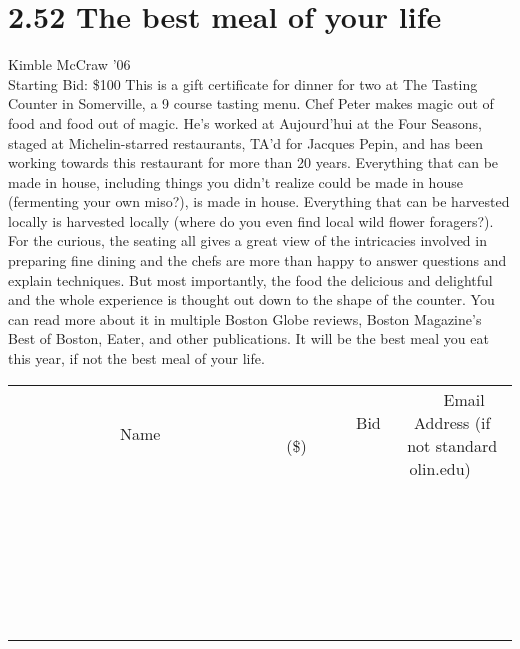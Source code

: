 \documentclass[11pt]{article}
\begin{document}
\section*{2.52 The best meal of your life}
Kimble McCraw '06
\\
Starting Bid: \$100
\newline
This is a gift certificate for dinner for two at The Tasting Counter in Somerville, a 9 course tasting menu. Chef Peter makes magic out of food and food out of magic. He's worked at Aujourd’hui at the Four Seasons, staged at Michelin-starred restaurants, TA'd for Jacques Pepin, and has been working towards this restaurant for more than 20 years. Everything that can be made in house, including things you didn't realize could be made in house (fermenting your own miso?), is made in house. Everything that can be harvested locally is harvested locally (where do you even find local wild flower foragers?). For the curious, the seating all gives a great view of the intricacies involved in preparing fine dining and the  chefs are more than happy to answer questions and explain techniques. But most importantly, the food the delicious and delightful and the whole experience is thought out down to the shape of the counter. You can read more about it in multiple Boston Globe reviews, Boston Magazine's Best of Boston, Eater, and other publications. It will be the best meal you eat this year, if not the best meal of your life.
\\[6ex]
\begin{tabular}{c c c}
~~~~~~~~~~~~~Name~~~~~~~~~~~~~ & ~~~~~~~~~Bid (\$)~~~~~~~~~  & ~~~Email Address (if not standard olin.edu)~~~\\
 & & \\
\hline
 & & \\
\hline
 & & \\
\hline
 & & \\
\hline
 & & \\
\hline
 & & \\
\hline
 & & \\
\hline
 & & \\
\hline
 & & \\
\hline
 & & \\
\hline
 & & \\
\hline
 & & \\
\hline
 & & \\
\hline
 & & \\
\hline
 & & \\
\hline
 & & \\
\hline
 & & \\
\hline
 & & \\
\hline
 & & \\
\hline
 & & \\
\hline
 & & \\
\hline
 & & \\
\hline
 & & \\
\hline
 & & \\
\hline
 & & \\
\hline
 & & \\
\hline
\end{tabular}
\newpage
\end{document}
